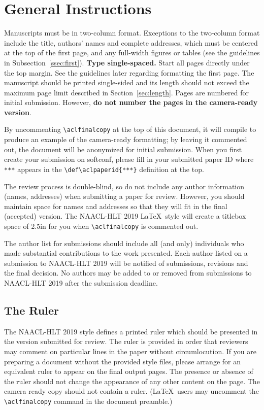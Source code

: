 \documentclass{article}
\begin{document}
\section{General Instructions}

Manuscripts must be in two-column format.  Exceptions to the
two-column format include the title, authors' names and complete
addresses, which must be centered at the top of the first page, and
any full-width figures or tables (see the guidelines in
Subsection~\ref{ssec:first}). {\bf Type single-spaced.}  Start all
pages directly under the top margin. See the guidelines later
regarding formatting the first page.  The manuscript should be
printed single-sided and its length
should not exceed the maximum page limit described in Section~\ref{sec:length}.
Pages are numbered for  initial submission. However, {\bf do not number the pages in the camera-ready version}.

By uncommenting {\small\verb|\aclfinalcopy|} at the top of this 
 document, it will compile to produce an example of the camera-ready formatting; by leaving it commented out, the document will be anonymized for initial submission.  When you first create your submission on softconf, please fill in your submitted paper ID where {\small\verb|***|} appears in the {\small\verb|\def\aclpaperid{***}|} definition at the top.

The review process is double-blind, so do not include any author information (names, addresses) when submitting a paper for review.  
However, you should maintain space for names and addresses so that they will fit in the final (accepted) version.  The NAACL-HLT 2019 \LaTeX\ style will create a titlebox space of 2.5in for you when {\small\verb|\aclfinalcopy|} is commented out.  

The author list for submissions should include all (and only) individuals who made substantial contributions to the work presented. Each author listed on a submission to NAACL-HLT 2019 will be notified of submissions, revisions and the final decision. No authors may be added to or removed from submissions to NAACL-HLT 2019 after the submission deadline.

\subsection{The Ruler}
The NAACL-HLT 2019 style defines a printed ruler which should be presented in the
version submitted for review.  The ruler is provided in order that
reviewers may comment on particular lines in the paper without
circumlocution.  If you are preparing a document without the provided
style files, please arrange for an equivalent ruler to
appear on the final output pages.  The presence or absence of the ruler
should not change the appearance of any other content on the page.  The
camera ready copy should not contain a ruler. (\LaTeX\ users may uncomment the {\small\verb|\aclfinalcopy|} command in the document preamble.)  
\end{document}
